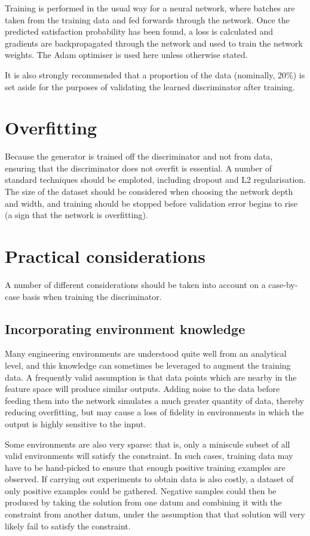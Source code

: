 \documentclass[../../main.tex]{subfiles}
\begin{document}
Training is performed in the usual way for a neural network, where batches are taken from the training data and fed forwards through the network.
Once the predicted satisfaction probability has been found, a loss is calculated and gradients are backpropagated through the network and used to train the network weights.
The Adam optimiser is used here unless otherwise stated.

It is also strongly recommended that a proportion of the data (nominally, 20\%) is set aside for the purposes of validating the learned discriminator after training.

\section{Overfitting}

Because the generator is trained off the discriminator and not from data, ensuring that the discriminator does not overfit is essential.
A number of standard techniques should be emploted, including dropout and L2 regularisation.
The size of the dataset should be considered when choosing the network depth and width, and training should be stopped before validation error begins to rise (a sign that the network is overfitting).

\section{Practical considerations}

A number of different considerations should be taken into account on a case-by-case basis when training the discriminator.

\subsection{Incorporating environment knowledge}

Many engineering environments are understood quite well from an analytical level, and this knowledge can sometimes be leveraged to augment the training data.
A frequently valid assumption is that data points which are nearby in the feature space will produce similar outputs.
Adding noise to the data before feeding them into the network simulates a much greater quantity of data, thereby reducing overfitting, but may cause a loss of fidelity in environments in which the output is highly sensitive to the input.

Some environments are also very sparse: that is, only a miniscule subset of all valid environments will satisfy the constraint.
In such cases, training data may have to be hand-picked to ensure that enough positive training examples are observed.
If carrying out experiments to obtain data is also costly, a dataset of only positive examples could be gathered.
Negative samples could then be produced by taking the solution from one datum and combining it with the constraint from another datum, under the assumption that that solution will very likely fail to satisfy the constraint.
\end{document}
